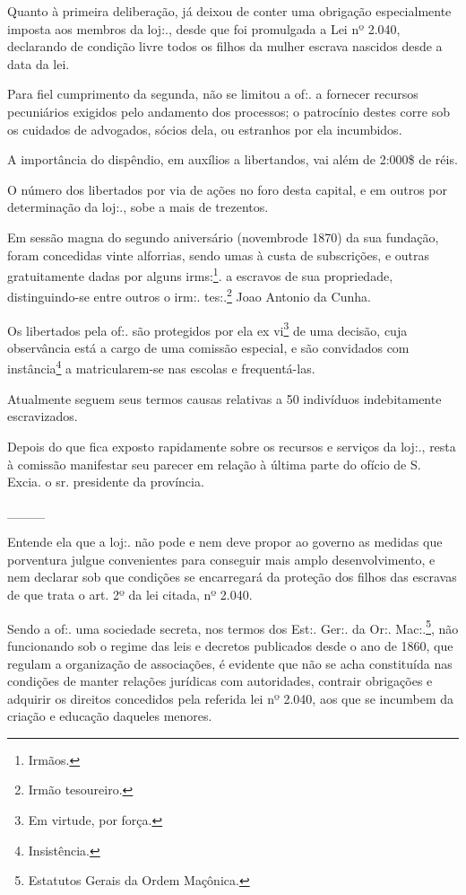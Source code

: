 {Quanto à primeira deliberação, já deixou de conter uma obrigação
especialmente imposta aos membros da loj:., desde que foi promulgada a
Lei nº 2.040, declarando de condição livre todos os filhos da mulher
escrava nascidos desde a data da lei.

Para fiel cumprimento da segunda, não se limitou a of:. a fornecer
recursos pecuniários exigidos pelo andamento dos processos; o patrocínio
destes corre sob os cuidados de advogados, sócios dela, ou estranhos por
ela incumbidos.

A importância do dispêndio, em auxílios a libertandos, vai além de
2:000\$ de réis.

O número dos libertados por via de ações no foro desta capital, e em
outros por determinação da loj:., sobe a mais de trezentos.

Em sessão magna do segundo aniversário (novembrode 1870) da sua
fundação, foram concedidas vinte alforrias, sendo umas à custa de
subscrições, e outras gratuitamente dadas por alguns irms:\footnote{
  Irmãos.}. a escravos de sua propriedade, distinguindo-se entre outros
o irm:. tes:.\footnote{ Irmão tesoureiro.} Joao Antonio da Cunha.

Os libertados pela of:. são protegidos por ela ex vi\footnote{ Em
  virtude, por força.} de uma decisão, cuja observância está a cargo de
uma comissão especial, e são convidados com instância\footnote{
  Insistência.} a matricularem-se nas escolas e frequentá-las.

Atualmente seguem seus termos causas relativas a 50 indivíduos
indebitamente escravizados.

Depois do que fica exposto rapidamente sobre os recursos e serviços da
loj:., resta à comissão manifestar seu parecer em relação à última parte
do ofício de S. Excia. o sr. presidente da província.

\_\_\_\_

Entende ela que a loj:. não pode e nem deve propor ao governo as medidas
que porventura julgue convenientes para conseguir mais amplo
desenvolvimento, e nem declarar sob que condições se encarregará da
proteção dos filhos das escravas de que trata o art. 2º da lei citada,
nº 2.040.

Sendo a of:. uma sociedade secreta, nos termos dos Est:. Ger:. da Or:.
Mac:.\footnote{ Estatutos Gerais da Ordem Maçônica.}, não funcionando
sob o regime das leis e decretos publicados desde o ano de 1860, que
regulam a organização de associações, é evidente que não se acha
constituída nas condições de manter relações jurídicas com autoridades,
contrair obrigações e adquirir os direitos concedidos pela referida lei
nº 2.040, aos que se incumbem da criação e educação daqueles menores.

}
